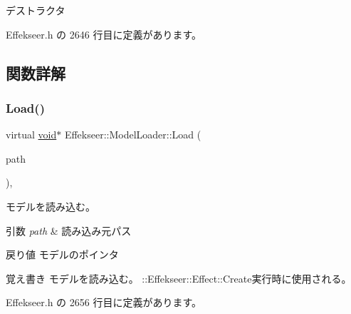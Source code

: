 デストラクタ 



 Effekseer.\+h の 2646 行目に定義があります。



\subsection{関数詳解}
\mbox{\label{class_effekseer_1_1_model_loader_a46b7aba9f998836bacd86411b858d06c}} 
\subsubsection{\texorpdfstring{Load()}{Load()}}
{\footnotesize\ttfamily virtual \mbox{\hyperlink{namespace_effekseer_ab34c4088e512200cf4c2716f168deb56}{void}}$\ast$ Effekseer\+::\+Model\+Loader\+::\+Load (\begin{DoxyParamCaption}\item[{const \mbox{\hyperlink{_effekseer_8h_a50b026abea014b47854bcd835b3b6233}{E\+F\+K\+\_\+\+C\+H\+AR}} $\ast$}]{path }\end{DoxyParamCaption})\hspace{0.3cm}{\ttfamily [inline]}, {\ttfamily [virtual]}}



モデルを読み込む。 


\begin{DoxyParams}{引数}
{\em path} & 読み込み元パス \\
\hline
\end{DoxyParams}
\begin{DoxyReturn}{戻り値}
モデルのポインタ 
\end{DoxyReturn}
\begin{DoxyNote}{覚え書き}
モデルを読み込む。 \+::\+Effekseer\+::\+Effect\+::\+Create実行時に使用される。 
\end{DoxyNote}


 Effekseer.\+h の 2656 行目に定義があります。

\mbox{\label{class_effekseer_1_1_model_loader_a496f93a8615363ff31943adb205b5365}} 

